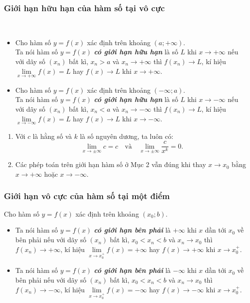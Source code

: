 \begin{tomtat}
    \subsubsection{Giới hạn hữu hạn của hàm số tại vô cực}
\begin{dn}
	\
	\begin{itemize}
		\item Cho hàm số $ y=f(x) $ xác định trên khoảng $ (a;+\infty) $.\\
		Ta nói hàm số $ y=f(x) $ \textbf{\textit{có giới hạn hữu hạn}} là số $ L $ khi $ x \to +\infty  $ nếu với dãy số $ (x_n) $ bất kì, $ x_n>a $ và $ x_n\to +\infty $ thì $ f(x_n)\to L $, kí hiệu $ \lim \limits_{x \to +\infty} f(x) =L$ hay $ f(x) \to L $ khi $ x\to +\infty $.
		\item Cho hàm số $ y=f(x) $ xác định trên khoảng $ (-\infty;a) $.\\
		Ta nói hàm số $ y=f(x) $ \textbf{\textit{có giới hạn hữu hạn}} là số $ L $ khi $ x \to -\infty $ nếu với dãy số $ (x_n) $ bất kì, $ x_n<a $ và $ x_n\to -\infty $ thì $ f(x_n)\to L $, kí hiệu $ \lim \limits_{x \to -\infty} f(x) =L$ hay $ f(x)\to L $ khi $ x\to -\infty $.
	\end{itemize}
\end{dn}
\begin{note}
	\begin{enumerate}
		\item Với $ c $ là hằng số và $ k $ là  số nguyên dương, ta luôn có:
		$$\lim \limits_{x \to \pm \infty} c=c\quad \text{và} \quad \lim \limits_{x \to \pm \infty} \dfrac{c}{x^k}=0.$$
		\item Các phép toán trên giới hạn hàm số ở Mục 2 vẫn đúng khi thay $ x\to x_0 $ bằng $ x\to +\infty $ hoặc $ x\to -\infty $.
	\end{enumerate}
\end{note}

\subsubsection{Giới hạn vô cực của hàm số tại một điểm}

\begin{dn}
	Cho hàm số $ y=f(x) $ xác định trên khoảng $ (x_0;b) $.
	\begin{itemize}
		\item 
		Ta nói hàm số $ y=f(x) $ \textbf{\textit{có giới hạn bên phải}} là $ +\infty $ khi $ x $ dần tới $ x_0 $ về bên phải nếu với dãy số $ (x_n) $ bất kì, $ x_0<x_n<b $ và $ x_n\to x_0 $ thì $ f(x_n)\to +\infty $, kí hiệu $ \lim \limits_{x \to x_0^+} f(x) =+\infty$ hay $ f(x)\to +\infty $ khi $ x \to x_0^+ $.
		\item Ta nói hàm số $ y=f(x) $ \textbf{\textit{có giới hạn bên phải}} là  $ -\infty $ khi $ x $ dần tới $ x_0 $ về bên phải nếu với dãy số $ (x_n) $ bất kì, $ x_0<x_n<b $ và $ x_n\to x_0 $ thì $ f(x_n)\to -\infty $, kí hiệu $ \lim \limits_{x \to x_0^+} f(x) =-\infty$ hay $ f(x)\to -\infty $ khi $ x\to x_0^+ $.
	\end{itemize}
\end{dn}


\end{tomtat}
